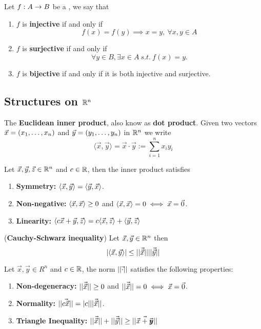 \documentclass{article}
\begin{document}
	\begin{definition}
		Let ${f}: {A} \to {B}$ be a , we say that
		\begin{enumerate}
			\item $f$ is \textbf{injective} if and only if
				\[
					f(x) = f(y) \implies x = y,\ \forall x, y \in A
				\]
			\item $f$ is \textbf{surjective} if and only if
				\[
					\forall y \in B, \exists x \in A \  s.t.\ f(x) = y.
				\]
			\item $f$ is \textbf{bijective} if and only if it is both injective and surjective.
		\end{enumerate}
	\end{definition}
	
	
	\subsection{Structures on $\mathbb{R}^n$}
	
	\begin{definition}
		The \textbf{Euclidean inner product}, also know as \textbf{dot product}. Given two vectors $\vec{x} = ({{x}_{1}}, \dots, {{x}_{n}})$ and $\vec{y} = ({{y}_{1}}, \dots, {{y}_{n}})$ in $\mathbb{R}^n$ we write
			\[
				\langle \vec{x}, \vec{y} \rangle = \vec{x} \cdot \vec{y} := \sum_{i=1}^n {x_i y_i}
			\]
	\end{definition}
	
	\begin{proposition}
		Let $\vec{x}, \vec{y}, \vec{z} \in \mathbb{R}^n$ and $c \in \mathbb{R}$, then the inner product satisfies
		\begin{enumerate}
			\item \textbf{Symmetry: } $\langle {\vec{{x}}}, {\vec{{y}}} \rangle = \langle {\vec{{y}}}, {\vec{{x}}} \rangle$.
			\item \textbf{Non-negative: } $\langle {\vec{{x}}}, {\vec{{x}}} \rangle \geq 0$ and $\langle {\vec{{x}}}, {\vec{{x}}} \rangle = 0 \iff \vec{x} = \vec{0}$.
			\item \textbf{Linearity: } $\langle {c \vec{x} + \vec{y}}, {\vec{z}} \rangle = c\langle {\vec{{x}}}, {\vec{{z}}} \rangle + \langle {\vec{{y}}}, {\vec{{z}}} \rangle$
		\end{enumerate}
	\end{proposition}
	
	
	\begin{theorem}
		(\textbf{Cauchy-Schwarz inequality}) Let $\vec{x}, \vec{y} \in \mathbb{R}^n$ then
		\[
			|\langle {\vec{{x}}}, {\vec{{y}}} \rangle| \leq \vert \vert \vec{{\vec{x}}} \vert \vert \vert \vert \vec{{\vec{y}}} \vert \vert
		\]
	\end{theorem}
	
	\begin{proposition}
		Let $\vec{x}, \vec{y} \in R^n$ and $c \in \mathbb{R}$, the norm $\vert \vert \vec{{\cdot}} \vert \vert$ satisfies the following properties:
		\begin{enumerate}
			\item \textbf{Non-degeneracy: } $\vert \vert \vec{{\vec{x}}} \vert \vert \geq 0$ and $\vert \vert \vec{{\vec{x}}} \vert \vert = 0 \iff \vec{x} = \vec{0}$.
			\item \textbf{Normality: } $\vert \vert \vec{{c \vec{x}}} \vert \vert = |c| \vert \vert \vec{{\vec{x}}} \vert \vert$.
			\item \textbf{Triangle Inequality: } $\vert \vert \vec{{\vec{x}}} \vert \vert + \vert \vert \vec{{\vec{y}}} \vert \vert \geq \vert \vert \vec{{\vec{x} + \vec{y}}} \vert \vert$
		\end{enumerate}
	\end{proposition}
	
\end{document}
